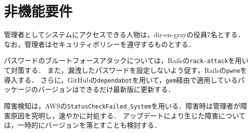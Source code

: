 \section{非機能要件}
管理者としてシステムにアクセスできる人物は，dir-en-grayの役員7名とする．なお，管理者はセキュリティポリシーを遵守するものとする．\par
パスワードのブルートフォースアタックについては，Railsの\texttt{rack-attack}を用いて対策する．
また，漏洩したパスワードを設定しないよう促す，Railsの\texttt{pwne}を導入する．
さらに，GitHubの\texttt{dependabot}を用いて，\texttt{gem}経由で適用しているパッケージのバージョンはできるだけ最新版に更新する．\par
障害検知は，AWSの\texttt{StatusCheckFailed\_System}を用いる．障害時は管理者が障害原因を究明し，速やかに対処する．
アップデートにより生じた障害については，一時的にバージョンを落とすことも検討する．
